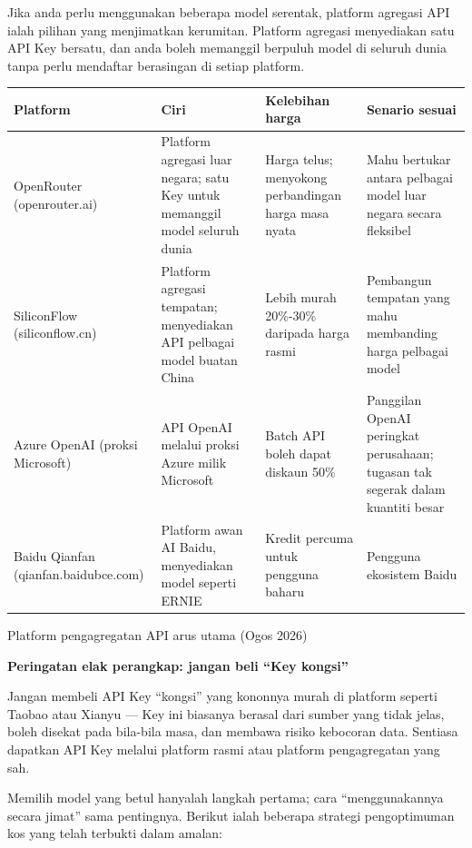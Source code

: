 
Jika anda perlu menggunakan beberapa model serentak, platform agregasi API ialah pilihan yang menjimatkan kerumitan. Platform agregasi menyediakan satu API Key bersatu, dan anda boleh memanggil berpuluh model di seluruh dunia tanpa perlu mendaftar berasingan di setiap platform.

\begin{center}
\begin{tabularx}{\linewidth}{|X|X|X|X|}
\hline
\textbf{Platform} & \textbf{Ciri} & \textbf{Kelebihan harga} & \textbf{Senario sesuai} \tabularnewline
\hline
OpenRouter (openrouter.ai) & Platform agregasi luar negara; satu Key untuk memanggil model seluruh dunia & Harga telus; menyokong perbandingan harga masa nyata & Mahu bertukar antara pelbagai model luar negara secara fleksibel \tabularnewline
SiliconFlow (siliconflow.cn) & Platform agregasi tempatan; menyediakan API pelbagai model buatan China & Lebih murah 20\%-30\% daripada harga rasmi & Pembangun tempatan yang mahu membanding harga pelbagai model \tabularnewline
Azure OpenAI (proksi Microsoft) & API OpenAI melalui proksi Azure milik Microsoft & Batch API boleh dapat diskaun 50\% & Panggilan OpenAI peringkat perusahaan; tugasan tak segerak dalam kuantiti besar \tabularnewline
Baidu Qianfan (qianfan.baidubce.com) & Platform awan AI Baidu, menyediakan model seperti ERNIE & Kredit percuma untuk pengguna baharu & Pengguna ekosistem Baidu \tabularnewline
\hline
\end{tabularx}
\end{center}

\begin{center}\small\color{gray}Platform pengagregatan API arus utama (Ogos 2026)\end{center}

\textbf{Peringatan elak perangkap: jangan beli “Key kongsi”}\par

Jangan membeli API Key “kongsi” yang kononnya murah di platform seperti Taobao atau Xianyu — Key ini biasanya berasal dari sumber yang tidak jelas, boleh disekat pada bila-bila masa, dan membawa risiko kebocoran data. Sentiasa dapatkan API Key melalui platform rasmi atau platform pengagregatan yang sah.


Memilih model yang betul hanyalah langkah pertama; cara “menggunakannya secara jimat” sama pentingnya. Berikut ialah beberapa strategi pengoptimuman kos yang telah terbukti dalam amalan:

